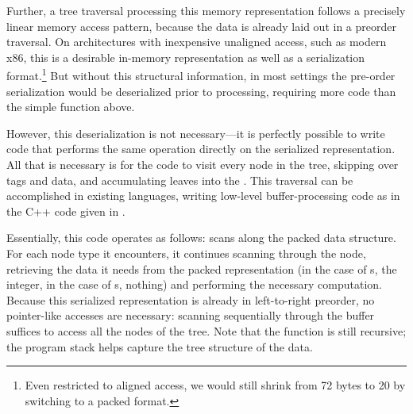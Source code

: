 Further, a tree traversal processing this memory representation
follows a precisely linear memory access pattern, because the data is
already laid out in a preorder traversal.
%
On architectures with inexpensive unaligned access, such as modern
x86, this is a desirable in-memory representation as well as a
serialization format.\footnote{Even restricted to aligned access, we
  would still shrink from 72 bytes to 20 by switching to a packed
  format.}
%
But without this structural information, in most settings the
pre-order serialization would be deserialized prior to processing,
requiring more code than the simple  function above.

However, this deserialization
is not necessary---it is perfectly possible to write code that performs
the same  operation directly on the serialized representation.
All that is necessary is for the code to visit every node in the tree, skipping over
tags and  data, and accumulating leaves into the .
%
This traversal can be accomplished in existing languages, writing low-level
buffer-processing code as in the C++ code given in .

Essentially, this code operates as follows:  scans along the packed
data structure. For each node type it encounters, it continues scanning
through the node, retrieving the data it needs from the packed representation
(in the case of s, the integer, in the case of s,
nothing) and performing the necessary computation. Because this serialized
representation is already in left-to-right preorder, no pointer-like
accesses are necessary: scanning sequentially through the buffer suffices to
access all the nodes of the tree. Note that the  function is
still recursive; the program stack helps capture the tree structure of the
data.

